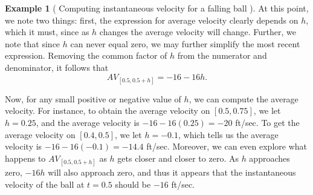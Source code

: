 \documentclass[10pt,]{book}
\theoremstyle{plain}
\theoremstyle{definition}
\theoremstyle{definition}
\theoremstyle{definition}
\newtheorem{example}[theorem]{Example}
\theoremstyle{definition}
\theoremstyle{definition}
\numberwithin{equation}{section}
\begin{document}
\begin{example}[
    Computing instantaneous velocity for a falling ball
  ]
    At this point, we note two things: first, the expression for average velocity clearly depends on \(h\), which it must, since as \(h\) changes the average velocity will change. Further, we note that since \(h\) can never equal zero, we may further simplify the most recent expression. Removing the common factor of \(h\) from the numerator and denominator, it follows that
\begin{equation*}
     AV_{[0.5, 0.5+h]} = -16 - 16h.
    \end{equation*}\par

    Now, for any small positive or negative value of \(h\), we can compute the average velocity. For instance, to obtain the average velocity on \([0.5,0.75]\), we let \(h = 0.25\), and the average velocity is \(-16 - 16(0.25) = -20\) ft/sec. To get the average velocity on \([0.4, 0.5]\), we let \(h = -0.1\), which tells us the average velocity is \(-16 - 16(-0.1) = -14.4\) ft/sec. Moreover, we can even explore what happens to \(AV_{[0.5, 0.5+h]}\) as \(h\) gets closer and closer to zero. As \(h\) approaches zero, \(-16h\) will also approach zero, and thus it appears that the instantaneous velocity of the ball at \(t = 0.5\) should be \(-16\) ft/sec.
\end{example}
\par
\end{document}
